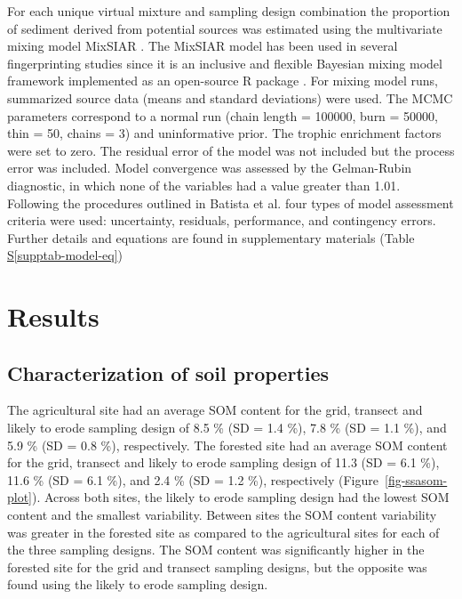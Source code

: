 \documentclass[
  number]{elsarticle}
\newcommand*\quartosupptabref[1]{Table \hyperref[#1]{S\ref{#1}}}
\begin{document}
For each unique virtual mixture and sampling design combination the
proportion of sediment derived from potential sources was estimated
using the multivariate mixing model MixSIAR \citep[MixSIAR v
3.1.12][]{stock2016}. The MixSIAR model has been used in several
fingerprinting studies since it is an inclusive and flexible Bayesian
mixing model framework implemented as an open-source R package
\citep{stock2016a}. For mixing model runs, summarized source data (means
and standard deviations) were used. The MCMC parameters correspond to a
normal run (chain length = 100000, burn = 50000, thin = 50, chains = 3)
and uninformative prior. The trophic enrichment factors were set to
zero. The residual error of the model was not included but the process
error was included. Model convergence was assessed by the Gelman-Rubin
diagnostic, in which none of the variables had a value greater than
1.01. Following the procedures outlined in Batista et al.
\citep{batista2022} four types of model assessment criteria were used:
uncertainty, residuals, performance, and contingency errors. Further
details and equations are found in supplementary materials
(\quartosupptabref{supptab-model-eq})

\section{Results}\label{results}

\subsection{Characterization of soil
properties}\label{characterization-of-soil-properties}

The agricultural site had an average SOM content for the grid, transect
and likely to erode sampling design of 8.5 \% (SD = 1.4 \%), 7.8 \% (SD
= 1.1 \%), and 5.9 \% (SD = 0.8 \%), respectively. The forested site had
an average SOM content for the grid, transect and likely to erode
sampling design of 11.3 (SD = 6.1 \%), 11.6 \% (SD = 6.1 \%), and 2.4 \%
(SD = 1.2 \%), respectively (Figure~\ref{fig-ssasom-plot}). Across both
sites, the likely to erode sampling design had the lowest SOM content
and the smallest variability. Between sites the SOM content variability
was greater in the forested site as compared to the agricultural sites
for each of the three sampling designs. The SOM content was
significantly higher in the forested site for the grid and transect
sampling designs, but the opposite was found using the likely to erode
sampling design.
\end{document}
